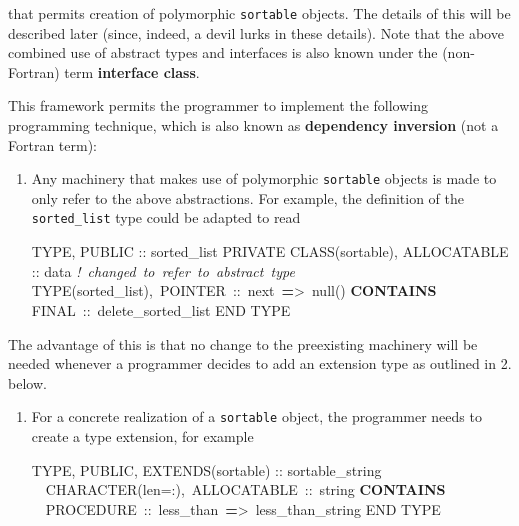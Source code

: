 \documentclass[
]{article}
\newenvironment{Shaded}{}{}
\newcommand{\CommentTok}[1]{\textcolor[rgb]{0.38,0.63,0.69}{\textit{#1}}}
\newcommand{\DataTypeTok}[1]{\textcolor[rgb]{0.56,0.13,0.00}{#1}}
\newcommand{\KeywordTok}[1]{\textcolor[rgb]{0.00,0.44,0.13}{\textbf{#1}}}
\newcommand{\NormalTok}[1]{#1}
\newcommand{\OperatorTok}[1]{\textcolor[rgb]{0.40,0.40,0.40}{#1}}
\begin{document}
that permits creation of polymorphic \texttt{sortable} objects. The
details of this will be described later (since, indeed, a devil lurks in
these details). Note that the above combined use of abstract types and
interfaces is also known under the (non-Fortran) term \textbf{interface
class}.

This framework permits the programmer to implement the following
programming technique, which is also known as \textbf{dependency
inversion} (not a Fortran term):

\begin{enumerate}
\def\labelenumi{\arabic{enumi}.}
\item
  Any machinery that makes use of polymorphic \texttt{sortable} objects
  is made to only refer to the above abstractions. For example, the
  definition of the \texttt{sorted\_list} type could be adapted to read

\begin{Shaded}
\begin{Highlighting}[]
\DataTypeTok{TYPE}\NormalTok{, }\DataTypeTok{PUBLIC} \DataTypeTok{::}\NormalTok{ sorted\_list}
   \DataTypeTok{PRIVATE}
   \DataTypeTok{CLASS(sortable)}\NormalTok{, }\DataTypeTok{ALLOCATABLE} \DataTypeTok{::}\NormalTok{ data}
   \CommentTok{! changed to refer to abstract type}
   \DataTypeTok{TYPE(sorted\_list)}\NormalTok{, POINTER }\DataTypeTok{::}\NormalTok{ next }\KeywordTok{=}\OperatorTok{\textgreater{}}\NormalTok{ null()}
\KeywordTok{CONTAINS}
\NormalTok{   FINAL }\DataTypeTok{::}\NormalTok{ delete\_sorted\_list}
\DataTypeTok{END TYPE}
\end{Highlighting}
\end{Shaded}
\end{enumerate}

The advantage of this is that no change to the preexisting machinery
will be needed whenever a programmer decides to add an extension type as
outlined in 2. below.

\begin{enumerate}
\def\labelenumi{\arabic{enumi}.}
\setcounter{enumi}{1}
\item
  For a concrete realization of a \texttt{sortable} object, the
  programmer needs to create a type extension, for example

\begin{Shaded}
\begin{Highlighting}[]
\DataTypeTok{TYPE}\NormalTok{, }\DataTypeTok{PUBLIC}\NormalTok{, }\DataTypeTok{EXTENDS(sortable)} \DataTypeTok{::}\NormalTok{ sortable\_string}
   \DataTypeTok{CHARACTER(len=:)}\NormalTok{, ALLOCATABLE }\DataTypeTok{::}\NormalTok{ string}
\KeywordTok{CONTAINS}
   \DataTypeTok{PROCEDURE} \DataTypeTok{::}\NormalTok{ less\_than }\KeywordTok{=}\OperatorTok{\textgreater{}}\NormalTok{ less\_than\_string}
\DataTypeTok{END TYPE}
\end{Highlighting}
\end{Shaded}
\end{enumerate}
\end{document}

